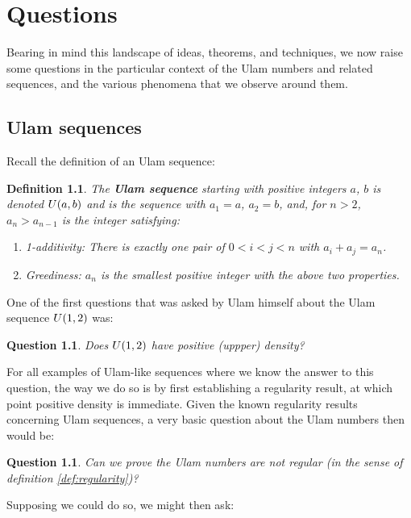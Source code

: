 \documentclass{report}
\newtheorem{question}[theorem]{Question}
\newtheorem{definition}[theorem]{Definition}
\theoremstyle{remark}
\numberwithin{equation}{section}
\begin{document}
\chapter{Questions}

Bearing in mind this landscape of ideas, theorems, and techniques, we
now raise some questions in the particular context of the Ulam numbers
and related sequences, and the various phenomena that we observe
around them.  

\section{Ulam sequences}

Recall the definition of an Ulam sequence: 

\begin{definition}
  The \textbf{Ulam sequence} starting with positive integers $a$, $b$
  is denoted $U(a,b)$ and is the sequence with $a_1 = a$,
  $a_2 = b$, and, for $n > 2$, $a_n > a_{n-1}$ is the integer satisfying:
  \begin{enumerate}
  \item 1-additivity: There is exactly one pair of $0 < i < j < n$ with $a_i + a_j = a_n$.
  \item Greediness: $a_n$ is the smallest positive integer with the above two
    properties.
\end{enumerate}

\end{definition}

One of the first questions that was asked by Ulam himself about the
Ulam sequence $U(1,2)$ was: 

\begin{question}\label{qn:density}
  Does $U(1,2)$ have positive (uppper) density?
\end{question}

For all examples of Ulam-like sequences where we know the answer to
this question, the way we do so is by first establishing a regularity
result, at which point positive density is immediate.  Given the known
regularity results concerning Ulam sequences, a very basic question
about the Ulam numbers then would be:

\begin{question}\label{qn:irregular}
  Can we prove the Ulam numbers are not regular (in the sense of
  definition \ref{def:regularity})?
\end{question}

Supposing we could do so, we might then ask:
\end{document}
